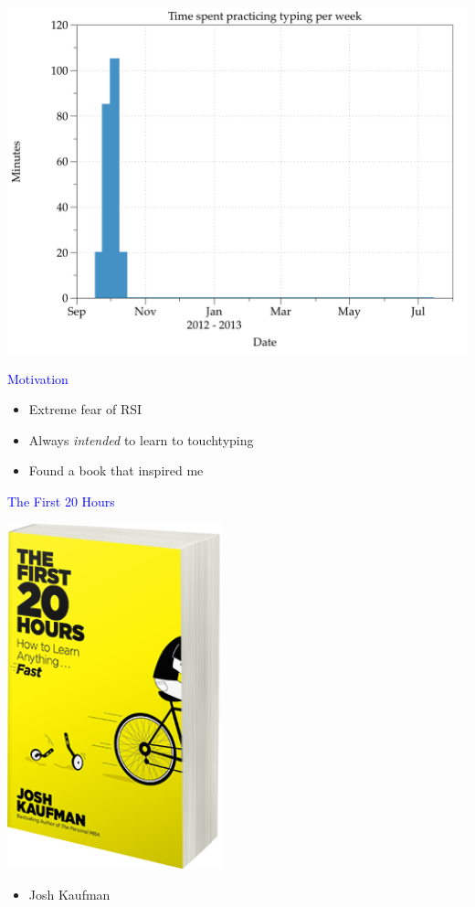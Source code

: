 \documentclass[landscape]{slides}
\begin{document}
\begin{slide}
    \includegraphics[width=\textwidth]{first-practice-long-tail}
\end{slide}


\begin{slide}

    \textcolor{blue}{\Large{Motivation}}

    \begin{itemize}
        \item Extreme fear of RSI
        \item Always \emph{intended} to learn to touchtyping
        \item Found a book that inspired me
    \end{itemize}

\end{slide}


\begin{slide}

    \textcolor{blue}{\Large{The First 20 Hours}}

    \includegraphics[height=10cm]{first20hours-cover}

    \begin{itemize}
        \item Josh Kaufman
    \end{itemize}

\end{slide}
\end{document}
